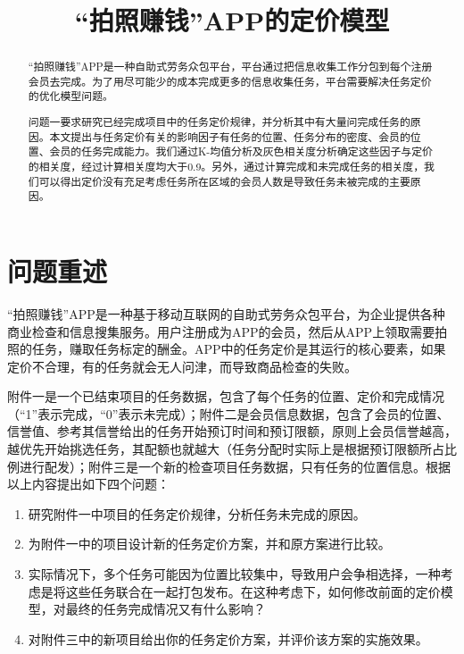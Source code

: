 \documentclass[withoutpreface,bwprint]{cumcmthesis} %
\title{“拍照赚钱”APP的定价模型}
\begin{document}
\maketitle
\begin{abstract}
    “拍照赚钱”APP是一种自助式劳务众包平台，平台通过把信息收集工作分包到每个注册会员去完成。为了用尽可能少的成本完成更多的信息收集任务，平台需要解决任务定价的优化模型问题。

    问题一要求研究已经完成项目中的任务定价规律，并分析其中有大量问完成任务的原因。本文提出与任务定价有关的影响因子有任务的位置、任务分布的密度、会员的位置、会员的任务完成能力。我们通过K-均值分析及灰色相关度分析确定这些因子与定价的相关度，经过计算相关度均大于0.9。另外，通过计算完成和未完成任务的相关度，我们可以得出定价没有充足考虑任务所在区域的会员人数是导致任务未被完成的主要原因。

    

\end{abstract}
\section{问题重述}
“拍照赚钱”APP是一种基于移动互联网的自助式劳务众包平台，为企业提供各种商业检查和信息搜集服务。用户注册成为APP的会员，然后从APP上领取需要拍照的任务，赚取任务标定的酬金。APP中的任务定价是其运行的核心要素，如果定价不合理，有的任务就会无人问津，而导致商品检查的失败。

附件一是一个已结束项目的任务数据，包含了每个任务的位置、定价和完成情况（“1”表示完成，“0”表示未完成）；附件二是会员信息数据，包含了会员的位置、信誉值、参考其信誉给出的任务开始预订时间和预订限额，原则上会员信誉越高，越优先开始挑选任务，其配额也就越大（任务分配时实际上是根据预订限额所占比例进行配发）；附件三是一个新的检查项目任务数据，只有任务的位置信息。根据以上内容提出如下四个问题：

\begin{enumerate}
    \item 研究附件一中项目的任务定价规律，分析任务未完成的原因。
    \item 为附件一中的项目设计新的任务定价方案，并和原方案进行比较。
    \item 实际情况下，多个任务可能因为位置比较集中，导致用户会争相选择，一种考虑是将这些任务联合在一起打包发布。在这种考虑下，如何修改前面的定价模型，对最终的任务完成情况又有什么影响？
    \item 对附件三中的新项目给出你的任务定价方案，并评价该方案的实施效果。
\end{enumerate}
\end{document}
